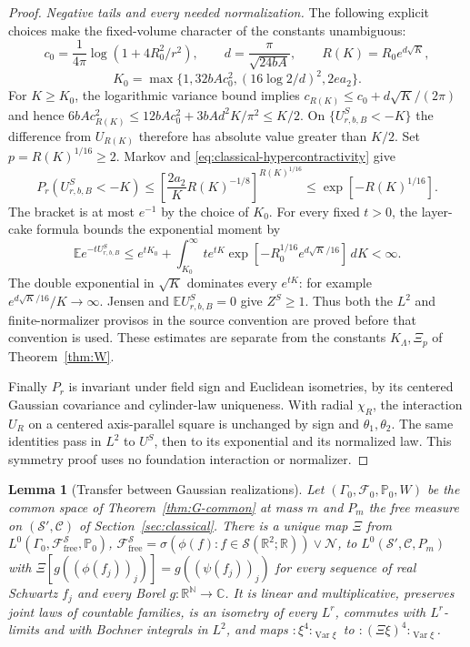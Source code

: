 \documentclass[11pt]{article}
\theoremstyle{plain}
\newtheorem{lemma}[theorem]{Lemma}
\theoremstyle{definition}
\theoremstyle{remark}
\newcommand{\R}{\mathbb{R}}
\newcommand{\C}{\mathbb{C}}
\newcommand{\N}{\mathbb{N}}
\newcommand{\E}{\mathbb{E}}
\newcommand{\PP}{\mathbb{P}}
\newcommand{\cC}{\mathcal{C}}
\newcommand{\cF}{\mathcal{F}}
\newcommand{\cN}{\mathcal{N}}
\newcommand{\cS}{\mathcal{S}}
\DeclareMathOperator{\Var}{Var}
\begin{document}
\begin{proof}
\emph{Negative tails and every needed normalization.} The following explicit
choices make the fixed-volume character of the constants unambiguous:
\[
 c_0=\frac1{4\pi}\log(1+4R_0^2/r^2),\qquad
 d=\frac{\pi}{\sqrt{24bA}},\qquad R(K)=R_0e^{d\sqrt K},
\]
\[
 K_0=\max\{1,32bA c_0^2,(16\log2/d)^2,2e a_2\}.
\]
For $K\ge K_0$, the logarithmic variance bound implies
$c_{R(K)}\le c_0+d\sqrt K/(2\pi)$ and hence
$6bA c_{R(K)}^2\le12bA c_0^2+3bA d^2K/\pi^2\le K/2$.
On $\{U^S_{r,b,B}<-K\}$ the difference from $U_{R(K)}$ therefore has
absolute value greater than $K/2$. Set $p=R(K)^{1/16}\ge2$. Markov and
\eqref{eq:classical-hypercontractivity} give
\begin{equation}\label{eq:classical-negative-tail}
 P_r(U^S_{r,b,B}<-K)
 \le\left[\frac{2a_2}{K}R(K)^{-1/8}\right]^{R(K)^{1/16}}
 \le\exp[-R(K)^{1/16}].
\end{equation}
The bracket is at most $e^{-1}$ by the choice of $K_0$.
For every fixed $t>0$, the layer-cake formula bounds the exponential moment
by
\begin{equation}\label{eq:classical-normalizer}
 \E e^{-tU^S_{r,b,B}}
 \le e^{tK_0}+\int_{K_0}^\infty
       te^{tK}\exp[-R_0^{1/16}e^{d\sqrt K/16}]\,dK<\infty.
\end{equation}
The double exponential in $\sqrt K$ dominates every $e^{tK}$: for example
$e^{d\sqrt K/16}/K\to\infty$. Jensen and $\E U^S_{r,b,B}=0$ give $Z^S\ge1$.
Thus both the $L^2$ and finite-normalizer provisos in the source convention
are proved before that convention is used. These estimates are separate
from the constants $K_\Lambda,\Xi_p$ of Theorem~\ref{thm:W}.

Finally $P_r$ is invariant under field sign and Euclidean isometries, by
its centered Gaussian covariance and cylinder-law uniqueness. With radial
$\chi_R$, the interaction $U_R$ on a centered axis-parallel square is
unchanged by sign and $\theta_1,\theta_2$. The same identities pass in
$L^2$ to $U^S$, then to its exponential and its normalized law. This
symmetry proof uses no foundation interaction or normalizer.
\end{proof}


\begin{lemma}[Transfer between Gaussian realizations]\label{lem:transfer-gauss}
Let $(\Gamma_0,\cF_0,\PP_0,W)$ be the common space of Theorem~\ref{thm:G-common} at
mass $m$ and $P_m$ the free measure on $(\cS',\cC)$ of Section~\ref{sec:classical}.
There is a unique map $\Xi$ from $L^{0}(\Gamma_0,\cF^{\cS}_{\mathrm{free}},\PP_0)$,
$\cF^{\cS}_{\mathrm{free}}=\sigma(\phi(f):f\in\cS(\R^{2};\R))\vee\cN$, to $L^{0}(\cS',\cC,P_m)$ with
$\Xi[g((\phi(f_j))_j)]=g((\psi(f_j))_j)$ for every sequence of real Schwartz $f_j$ and
every Borel $g:\R^{\N}\to\C$. It is linear and multiplicative, preserves joint laws
of countable families, is an isometry of every $L^{r}$, commutes with
$L^{r}$-limits and with Bochner integrals in $L^{2}$, and maps
${:}\xi^{4}{:}_{\Var\xi}$ to ${:}(\Xi\xi)^{4}{:}_{\Var\xi}$.
\end{lemma}
\end{document}
